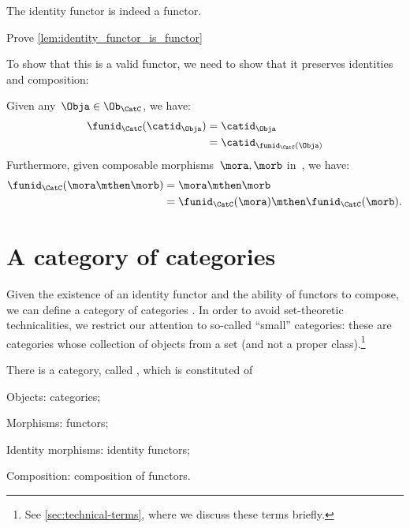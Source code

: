 \begin{lemma}
    \label{lem:identity_functor_is_functor}
    The identity functor is indeed a functor.
\end{lemma}

\begin{exercise}
    Prove \cref{lem:identity_functor_is_functor}
\end{exercise}
\begin{solution}
    To show that this is a valid functor, we need to show that it preserves identities and composition:
    \begin{compactitem}
        \item Given any~$\Obja \in \Ob_\CatC$, we have:
        \begin{equation*}
            \begin{aligned}
                \funid_{\CatC}(\catid_\Obja)&=\catid_\Obja\\
                &=\catid_{\funid_{\CatC}(\Obja)}
            \end{aligned}
        \end{equation*}
        Furthermore, given composable morphisms~$\mora,\morb$ in~\CatC, we have:
        \begin{equation*}
            \begin{aligned}
                \funid_{\CatC}(\mora\mthen\morb)&=\mora\mthen\morb\\
                &=\funid_{\CatC}(\mora)\mthen \funid_{\CatC} (\morb).
            \end{aligned}
        \end{equation*}
    \end{compactitem}
\end{solution}


\section{A category of categories}

Given the existence of an identity functor and the ability of functors to compose, we can define a category of categories \Category. In order to avoid set-theoretic technicalities, we restrict our attention to so-called ``small'' categories: these are categories whose collection of objects from a set (and not a proper class).\footnote{See \cref{sec:technical-terms}, where we discuss these terms briefly.}

\begin{ctdefinition}
    \label{def:Category}
    There is a category, called \Category, which is constituted of
    \begin{compactitem}
        \item Objects: categories;
        \item Morphisms: functors;
        \item Identity morphisms: identity functors;
        \item Composition: composition of functors.
    \end{compactitem}
\end{ctdefinition}

